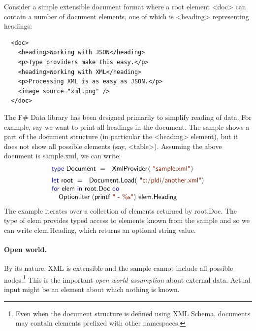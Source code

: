 \documentclass[10pt,preprint,blind,clearpagebib]{sigplanconf}
\newcommand{\langl}{\begin{picture}(4.5,7)
\put(1.1,2.5){\rotatebox{60}{\line(1,0){5.5}}}
\put(1.1,2.5){\rotatebox{300}{\line(1,0){5.5}}}
\end{picture}}
\newcommand{\rangl}{\begin{picture}(4.5,7)
\put(.9,2.5){\rotatebox{120}{\line(1,0){5.5}}}
\put(.9,2.5){\rotatebox{240}{\line(1,0){5.5}}}
\end{picture}}
\newcommand{\kvd}[1]{\textnormal{\textcolor{kvdclr}{\sffamily #1}}}
\newcommand{\str}[1]{\textnormal{\textcolor{strclr}{\sffamily "#1"}}}
\newcommand{\strf}[1]{\textnormal{\textcolor{strclr}{\sffamily #1}}}
\newcommand{\ident}[1]{\textnormal{\sffamily #1}}
\begin{document}
Consider a simple extensible document format where a root element {\ttfamily\small <doc>} can 
contain a number of document elements, one of which is {\ttfamily\small <heading>} representing 
headings:
%
{\small{
\begin{verbatim}
  <doc>
    <heading>Working with JSON</heading>
    <p>Type providers make this easy.</p>
    <heading>Working with XML</heading>
    <p>Processing XML is as easy as JSON.</p>
    <image source="xml.png" />
  </doc>
\end{verbatim}
}}
%
\noindent
The F\# Data library has been designed primarily to simplify reading of data. For example,
say we want to print all headings in the document. The sample shows a part of the document structure 
(in particular the {\ttfamily\small <heading>} element), but it does not show all possible elements 
(say, {\ttfamily\small <table>}). Assuming the above document is \strf{sample.xml}, we can write:
%
\noindent
\begin{equation*}
\begin{array}{l}
 \kvd{type}~\ident{Document}~=~\ident{XmlProvider}\langl\str{sample.xml}\rangl\hspace{1em} \\[0.5em]
 \kvd{let}~\ident{root}~=~\ident{Document.Load}(\str{c:/pldi/another.xml})\\
 \kvd{for}~\ident{elem}~\kvd{in}~\ident{root.Doc}~\kvd{do}\\
 \quad\ident{Option.iter}~(\ident{printf}~\str{ - \%s})~\ident{elem.Heading}\\
\end{array}
\end{equation*}
%
The example iterates over a collection of elements returned by \ident{root.Doc}. The type of \ident{elem} 
provides typed access to elements known from the sample and so we can write \ident{elem.Heading}, 
which returns an optional string value.

\paragraph{Open world.}
By its nature, XML is extensible and the sample cannot include all possible nodes.\footnote{Even 
when the document structure is defined using XML Schema, documents may contain elements prefixed 
with other namespaces.} This is the important \emph{open world assumption} about external data. 
Actual input might be an element about which nothing is known.
\end{document}
